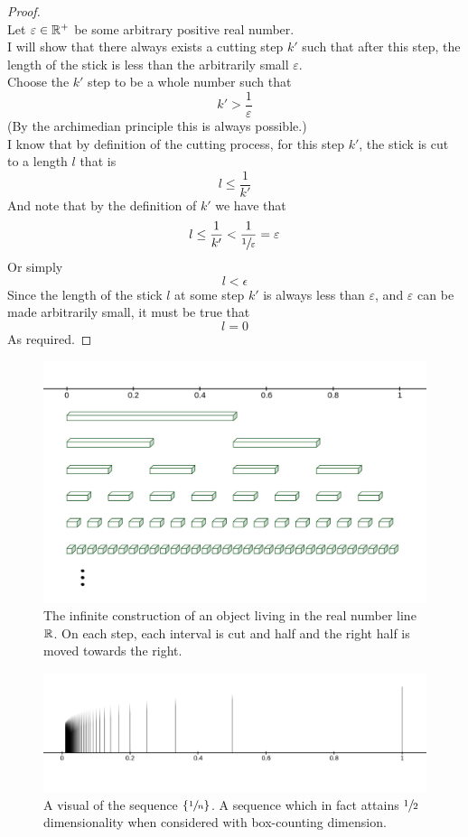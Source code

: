 \documentclass[11pt]{ekblite}
\begin{document}
\begin{example}
\begin{proof}
		\\[0.2in]Let $\varepsilon \in \mathbb{R}^+$ be some arbitrary positive real number.
		\\[0.2in]I will show that there always exists a cutting step $k'$ such that after this step, the length of the stick is less than the arbitrarily small $\varepsilon$. 
		\\[0.2in]Choose the $k'$ step to be a whole number such that
		\[k' > \frac{1}{\varepsilon}\]
		(By the archimedian principle this is always possible.)
		\\[0.2in]I know that by definition of the cutting process, for this step $k'$, the stick is cut to a length $l$ that is
		\[l \le \frac{1}{k'}\] 
		And note that by the definition of $k'$ we have that
		\[l \le \frac{1}{k'} < \frac{1}{\sfrac{1}{\varepsilon}} = \varepsilon\]
		Or simply
		\[l < \epsilon\]
		Since the length of the stick $l$ at some step $k'$ is always less than $\varepsilon$, and $\varepsilon$ can be made arbitrarily small, it must be true that 
		\[l = 0\] 
		As required.
	\end{proof}
\end{example}
\newpage
\begin{figure}[h]
	\includegraphics[scale=0.25]{img/c6.jpg}
	\caption{The infinite construction of an object living in the real number line $\mathbb{R}$. On each step, each interval is cut and half and the right half is moved towards the right.}
\end{figure}
\begin{figure}[h]
	\includegraphics[scale=0.25]{img/c21.jpg}
	\caption{A visual of the sequence $\{\sfrac{1}{n}\}$. A sequence which in fact attains $\sfrac{1}{2}$ dimensionality when considered with box-counting dimension.\cite{japan}}
\end{figure}
\end{document}
